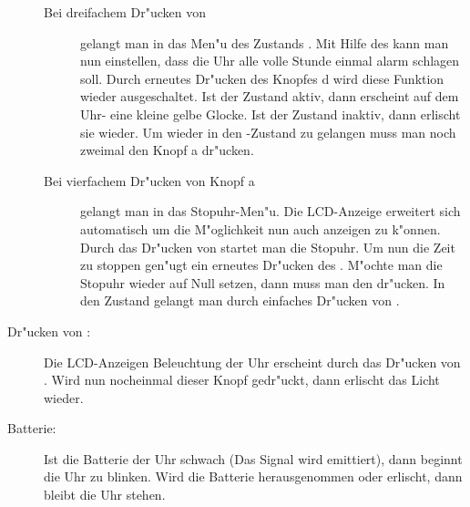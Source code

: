 \begin{description}
\begin{description}
\item[Bei dreifachem Dr"ucken von ]
gelangt man in das Men"u des Zustands . Mit Hilfe des 
kann man nun einstellen, dass die Uhr alle volle Stunde einmal  alarm schlagen
soll. Durch erneutes Dr"ucken des Knopfes d wird diese Funktion wieder
ausgeschaltet. Ist der Zustand  aktiv, dann erscheint auf dem
Uhr- eine kleine gelbe Glocke. Ist der Zustand inaktiv, dann 
erlischt sie wieder.  
Um wieder in den -Zustand zu gelangen muss man noch zweimal den 
Knopf a dr"ucken. 

\item[Bei vierfachem Dr"ucken von Knopf a] gelangt man in das Stopuhr-Men"u.
  Die LCD-Anzeige erweitert sich automatisch um die M"oglichkeit nun auch \cs
  anzeigen zu k"onnen. Durch das Dr"ucken von  startet man die 
Stopuhr. Um nun die Zeit zu stoppen gen"ugt ein erneutes Dr"ucken des 
.  M"ochte man die Stopuhr wieder auf Null setzen, dann muss 
man den   dr"ucken.  In den Zustand  gelangt man durch 
einfaches Dr"ucken  von .
\end{description}

\item[Dr"ucken von \kn{Knopf b}:]
Die LCD-Anzeigen Beleuchtung der Uhr erscheint durch das Dr"ucken von . Wird nun nocheinmal dieser Knopf gedr"uckt, dann erlischt das Licht
wieder. 
\item[Batterie:]
Ist die Batterie der Uhr schwach (Das Signal  wird
emittiert), dann beginnt die Uhr zu blinken. Wird die Batterie
herausgenommen oder erlischt, dann bleibt die Uhr stehen. 
\end{description}

